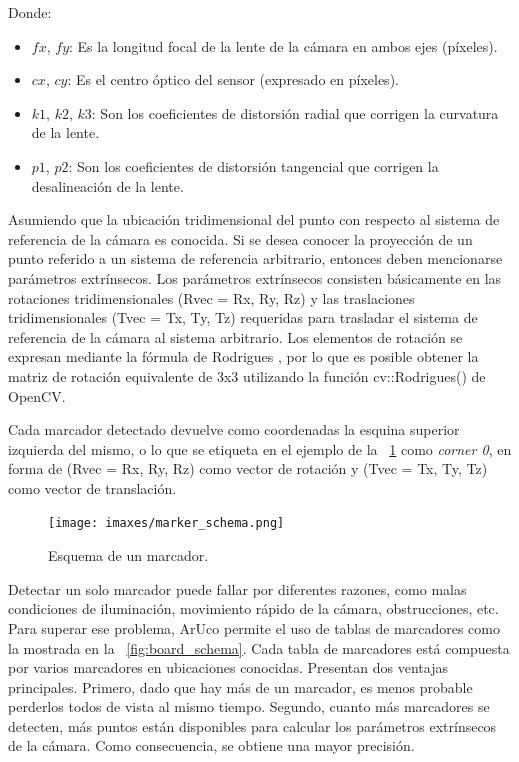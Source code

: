 Donde:
\begin{itemize}
	\item $fx$, $fy$: Es la longitud focal de la lente de la cámara en ambos ejes (píxeles).
	\item $cx$, $cy$: Es el centro óptico del sensor (expresado en píxeles).
	\item $k1$, $k2$, $k3$: Son los coeficientes de distorsión radial que corrigen la curvatura de la lente.
	\item $p1$, $p2$: Son los coeficientes de distorsión tangencial que corrigen la desalineación de la lente.
\end{itemize}
Asumiendo que la ubicación tridimensional del punto con respecto al sistema de referencia de la cámara es conocida. Si se desea conocer la proyección de un punto referido a un sistema de referencia arbitrario, entonces deben mencionarse parámetros extrínsecos. Los parámetros extrínsecos consisten básicamente en las rotaciones tridimensionales (Rvec = {Rx, Ry, Rz}) y las traslaciones tridimensionales (Tvec = {Tx, Ty, Tz}) requeridas para trasladar el sistema de referencia de la cámara al sistema arbitrario. Los elementos de rotación se expresan mediante la fórmula de Rodrigues \cite{mebius2007derivation}, por lo que es posible obtener la matriz de rotación equivalente de 3x3 utilizando la función cv::Rodrigues() de OpenCV.

Cada marcador detectado devuelve como coordenadas la esquina superior izquierda del mismo, o lo que se etiqueta en el ejemplo de la \figurename~\ref{fig:marker_schema} como \emph{corner 0}, en forma de (Rvec = {Rx, Ry, Rz}) como vector de rotación y (Tvec = {Tx, Ty, Tz}) como vector de translación.

\begin{figure}
	\centering
	\texttt{[image: imaxes/marker\_schema.png]}
	\caption{Esquema de un marcador.}
	\label{fig:marker_schema}
\end{figure}

Detectar un solo marcador puede fallar por diferentes razones, como malas condiciones de iluminación, movimiento rápido de la cámara, obstrucciones, etc. Para superar ese problema, ArUco permite el uso de tablas de marcadores como la mostrada en la \figurename~\ref{fig:board_schema}. Cada tabla de marcadores está compuesta por varios marcadores en ubicaciones conocidas. Presentan dos ventajas principales. Primero, dado que hay más de un marcador, es menos probable perderlos todos de vista al mismo tiempo. Segundo, cuanto más marcadores se detecten, más puntos están disponibles para calcular los parámetros extrínsecos de la cámara. Como consecuencia, se obtiene una mayor precisión.

